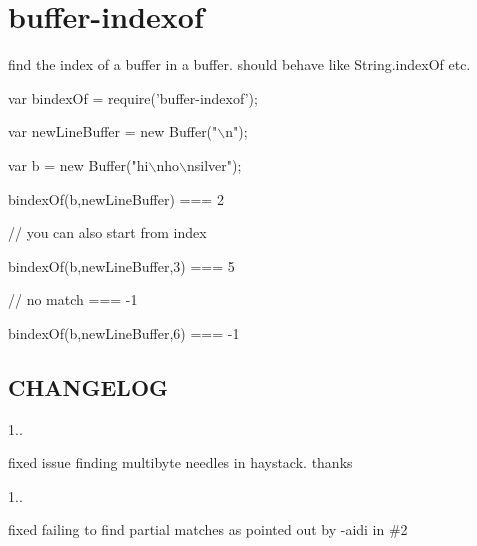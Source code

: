\href{http://travis-ci.org/soldair/node-buffer-indexof}{\tt }

\section*{buffer-\/indexof }

find the index of a buffer in a buffer. should behave like String.\+index\+Of etc.


\begin{DoxyCode}
var bindexOf = require('buffer-indexof');

var newLineBuffer = new Buffer("\(\backslash\)n");

var b = new Buffer("hi\(\backslash\)nho\(\backslash\)nsilver");


bindexOf(b,newLineBuffer) === 2

// you can also start from index

bindexOf(b,newLineBuffer,3) === 5

// no match === -1

bindexOf(b,newLineBuffer,6) === -1
\end{DoxyCode}


\subsection*{C\+H\+A\+N\+G\+E\+L\+OG }


\begin{DoxyItemize}
\item 1..
\begin{DoxyItemize}
\item fixed issue finding multibyte needles in haystack. thanks 
\end{DoxyItemize}
\item 1..
\begin{DoxyItemize}
\item fixed failing to find partial matches as pointed out by -\/aidi in \#2 
\end{DoxyItemize}
\end{DoxyItemize}
